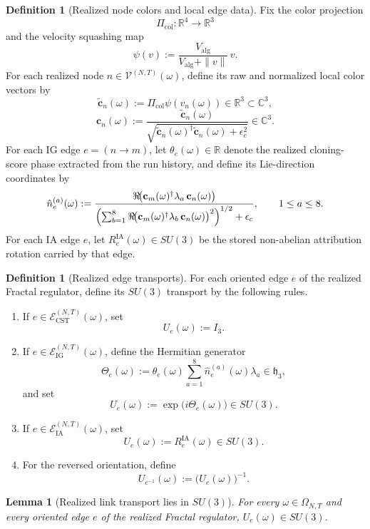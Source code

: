 \documentclass[11pt]{article}
\newtheorem{lemma}[theorem]{Lemma}
\theoremstyle{definition}
\newtheorem{definition}[theorem]{Definition}
\theoremstyle{remark}
\newcommand{\R}{\mathbb R}
\newcommand{\C}{\mathbb C}
\newcommand{\mcE}{\mathcal E}
\newcommand{\mcV}{\mathcal V}
\newcommand{\mathfrakh}{\mathfrak h_3}
\begin{document}
\begin{definition}[Realized node colors and local edge data]
\label{def:realized-node-color}
Fix the color projection
\[
\Pi_{\mathrm{col}}:\R^4\to\R^3
\]
and the velocity squashing map
\[
\psi(v):=\frac{V_{\mathrm{alg}}}{V_{\mathrm{alg}}+\|v\|}\,v.
\]
For each realized node \(n\in\mcV^{(N,T)}(\omega)\), define its raw and
normalized local color vectors by
\[
\tilde{\mathbf c}_n(\omega):=\Pi_{\mathrm{col}}\psi(v_n(\omega))\in\R^3\subset\C^3,
\]
\[
\mathbf c_n(\omega)
:=
\frac{\tilde{\mathbf c}_n(\omega)}
{\sqrt{\tilde{\mathbf c}_n(\omega)^\dagger\tilde{\mathbf c}_n(\omega)+\epsilon_c^2}}
\in\C^3.
\]
For each IG edge \(e=(n\to m)\), let \(\theta_e(\omega)\in\R\) denote the
realized cloning-score phase extracted from the run history, and define its
Lie-direction coordinates by
\[
\hat n_e^{(a)}(\omega)
:=
\frac{
\Re\!\bigl(\mathbf c_m(\omega)^\dagger\lambda_a\,\mathbf c_n(\omega)\bigr)}
{\Bigl(\sum_{b=1}^8
\Re\!\bigl(\mathbf c_m(\omega)^\dagger\lambda_b\,\mathbf c_n(\omega)\bigr)^2
\Bigr)^{1/2}+\epsilon_c},
\qquad
1\le a\le 8.
\]
For each IA edge \(e\), let \(R_e^{\mathrm{IA}}(\omega)\in SU(3)\) be the
stored non-abelian attribution rotation carried by that edge.
\end{definition}

\begin{definition}[Realized edge transports]
\label{def:realized-edge-transports}
For each oriented edge \(e\) of the realized Fractal regulator, define its
\(SU(3)\) transport by the following rules.
\begin{enumerate}[leftmargin=1.5em,label=\textnormal{(\roman*)}]
\item If \(e\in\mcE_{\mathrm{CST}}^{(N,T)}(\omega)\), set
\[
U_e(\omega):=I_3.
\]
\item If \(e\in\mcE_{\mathrm{IG}}^{(N,T)}(\omega)\), define the Hermitian
generator
\[
\Theta_e(\omega)
:=
\theta_e(\omega)\sum_{a=1}^8\hat n_e^{(a)}(\omega)\lambda_a\in\mathfrakh,
\]
and set
\[
U_e(\omega):=\exp\!\bigl(i\Theta_e(\omega)\bigr)\in SU(3).
\]
\item If \(e\in\mcE_{\mathrm{IA}}^{(N,T)}(\omega)\), set
\[
U_e(\omega):=R_e^{\mathrm{IA}}(\omega)\in SU(3).
\]
\item For the reversed orientation, define
\[
U_{e^{-1}}(\omega):=\bigl(U_e(\omega)\bigr)^{-1}.
\]
\end{enumerate}
\end{definition}

\begin{lemma}[Realized link transport lies in \(SU(3)\)]
\label{lem:realized-link-su3}
For every \(\omega\in\Omega_{N,T}\) and every oriented edge \(e\) of the
realized Fractal regulator, \(U_e(\omega)\in SU(3)\).
\end{lemma}
\end{document}
